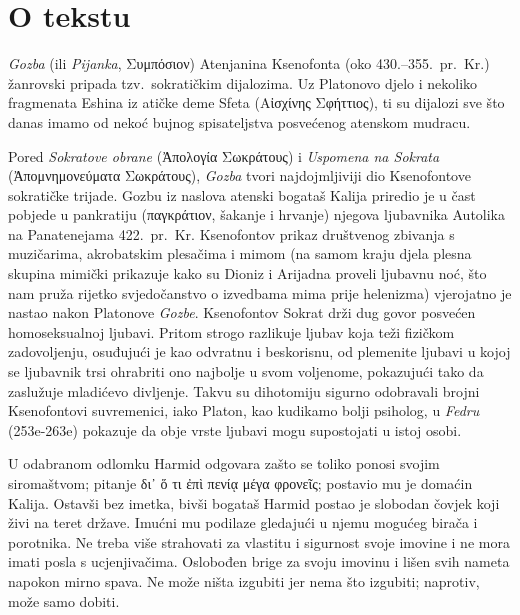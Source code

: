 

\section*{O tekstu}

\textit{Gozba} (ili \textit{Pijanka}, \textgreek[variant=ancient]{Συμπόσιον)} Atenjanina Ksenofonta (oko 430.–355.\ pr.~Kr.) žanrovski pripada tzv.\ sokratičkim dijalozima. Uz Platonovo djelo i nekoliko fragmenata Eshina iz atičke deme Sfeta \textgreek[variant=ancient]{(Αἰσχίνης Σφήττιος),} ti su dijalozi sve što danas imamo od nekoć bujnog spisateljstva posvećenog atenskom mudracu. 

Pored \textit{Sokratove obrane} \textgreek[variant=ancient]{(Ἀπολογία Σωκράτους)} i \textit{Uspomena na Sokrata} \textgreek[variant=ancient]{(Ἀπομνημονεύματα Σωκράτους),} \textit{Gozba} tvori najdojmljiviji dio Ksenofontove sokratičke trijade. Gozbu iz naslova atenski bogataš Kalija priredio je u čast pobjede u pankratiju \textgreek[variant=ancient]{(παγκράτιον,} šakanje i hrvanje) njegova ljubavnika Autolika na Panatenejama 422.\ pr.~Kr. Ksenofontov prikaz društvenog zbivanja s muzičarima, akrobatskim plesačima i mimom (na samom kraju djela plesna skupina mimički prikazuje kako su Dioniz i Arijadna proveli ljubavnu noć, što nam pruža rijetko svjedočanstvo o izvedbama mima prije helenizma) vjerojatno je nastao nakon Platonove \textit{Gozbe}. Ksenofontov Sokrat drži dug govor posvećen homoseksualnoj ljubavi. Pritom strogo razlikuje ljubav koja teži fizičkom zadovoljenju, osuđujući je kao odvratnu i beskorisnu, od plemenite ljubavi u kojoj se ljubavnik trsi ohrabriti ono najbolje u svom voljenome, pokazujući tako da zaslužuje mladićevo divljenje. Takvu su dihotomiju sigurno odobravali brojni Ksenofontovi suvremenici, iako Platon, kao kudikamo bolji psiholog, u \textit{Fedru} (253e-263e) pokazuje da obje vrste ljubavi mogu supostojati u istoj osobi. 

U odabranom odlomku Harmid odgovara zašto se toliko ponosi svojim siromaštvom; pitanje \textgreek[variant=ancient]{δι᾿ ὅ τι ἐπὶ πενίᾳ μέγα φρονεῖς;} postavio mu je domaćin Kalija. Ostavši bez imetka, bivši bogataš Harmid postao je slobodan čovjek koji živi na teret države. Imućni mu podilaze gledajući u njemu mogućeg birača i porotnika. Ne treba više strahovati za vlastitu i sigurnost svoje imovine i ne mora imati posla s ucjenjivačima. Oslobođen brige za svoju imovinu i lišen svih nameta napokon mirno spava. Ne može ništa izgubiti jer nema što izgubiti; naprotiv, može samo dobiti.

